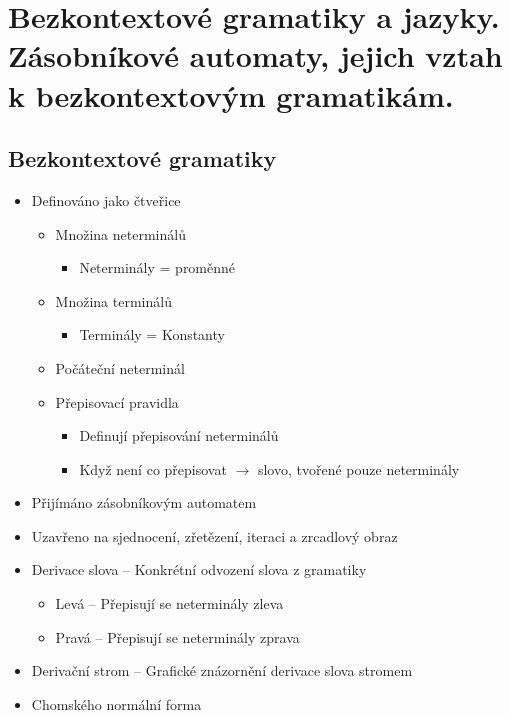 \documentclass[openany]{book}
\begin{document}
\section{Bezkontextové gramatiky a jazyky. Zásobníkové automaty, jejich vztah k bezkontextovým gramatikám.}

\subsection{Bezkontextové gramatiky}
\begin{itemize}
    \item Definováno jako čtveřice
    \begin{itemize}
        \item Množina neterminálů
        \begin{itemize}
            \item Neterminály = proměnné
        \end{itemize}
        \item Množina terminálů
        \begin{itemize}
            \item Terminály = Konstanty
        \end{itemize}
        \item Počáteční neterminál
        \item Přepisovací pravidla
        \begin{itemize}
            \item Definují přepisování neterminálů
            \item Když není co přepisovat \(\rightarrow\) slovo, tvořené pouze neterminály
        \end{itemize}
    \end{itemize} 
    \item Přijímáno zásobníkovým automatem
    \item Uzavřeno na sjednocení, zřetězení, iteraci a zrcadlový obraz
    \item Derivace slova -- Konkrétní odvození slova z gramatiky
    \begin{itemize}
        \item Levá -- Přepisují se neterminály zleva
        \item Pravá -- Přepisují se neterminály zprava
    \end{itemize}
    \item Derivační strom -- Grafické znázornění derivace slova stromem
    \item Chomského normální forma

\end{itemize}
\end{document}
